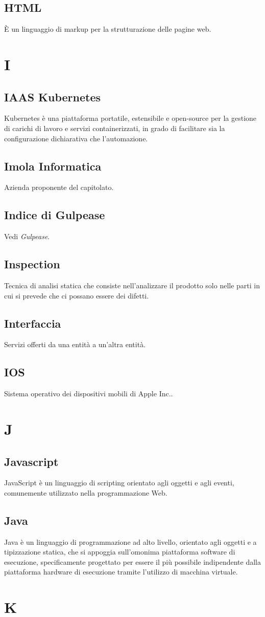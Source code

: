 \subsection{HTML} È un linguaggio di markup per la strutturazione delle pagine web.
\newpage \section{I}
\subsection{IAAS Kubernetes} Kubernetes è una piattaforma portatile, estensibile e open-source per la gestione di carichi di lavoro e servizi containerizzati, in grado di facilitare sia la configurazione dichiarativa che l'automazione.
\subsection{Imola Informatica} Azienda proponente del capitolato.
\subsection{Indice di Gulpease} Vedi \textit{Gulpease}.
\subsection{Inspection} Tecnica di analisi statica che consiste nell’analizzare il prodotto solo nelle parti in cui si prevede che ci possano essere dei difetti.
\subsection{Interfaccia} Servizi offerti da una entità a un'altra entità.
\subsection{IOS} Sistema operativo dei dispositivi mobili di Apple Inc..
\newpage \section{J}
\subsection{Javascript} JavaScript è un linguaggio di scripting orientato agli oggetti e agli eventi, comunemente utilizzato nella programmazione Web.
\subsection{Java} Java è un linguaggio di programmazione ad alto livello, orientato agli oggetti e a tipizzazione statica, che si appoggia sull’omonima piattaforma software di esecuzione, specificamente progettato per essere il più possibile indipendente dalla piattaforma hardware di esecuzione tramite l’utilizzo di macchina virtuale.
\newpage \section{K}
